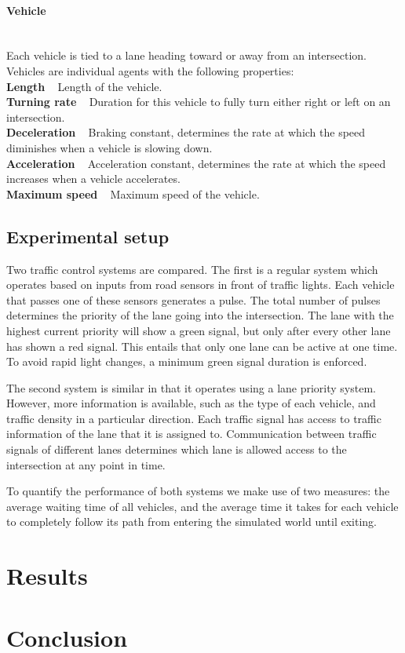 \documentclass{article}
\begin{document}
\paragraph{Vehicle} ~\\
Each vehicle is tied to a lane heading toward or away from an intersection. Vehicles are individual agents with the following properties:\\
\textbf{Length} ~ Length of the vehicle.\\
\textbf{Turning rate} ~ Duration for this vehicle to fully turn either right or left on an intersection.\\
\textbf{Deceleration} ~ Braking constant, determines the rate at which the speed diminishes when a vehicle is slowing down.\\
\textbf{Acceleration} ~ Acceleration constant, determines the rate at which the speed increases when a vehicle accelerates.\\
\textbf{Maximum speed} ~ Maximum speed of the vehicle.\\

\subsection{Experimental setup}
\label{exp_setup}
Two traffic control systems are compared. The first is a regular system which operates based on inputs from road sensors in front of traffic lights. Each vehicle that passes one of these sensors generates a pulse. The total number of pulses determines the priority of the lane going into the intersection. The lane with the highest current priority will show a green signal, but only after every other lane has shown a red signal. This entails that only one lane can be active at one time. To avoid rapid light changes, a minimum green signal duration is enforced.

The second system is similar in that it operates using a lane priority system. However, more information is available, such as the type of each vehicle, and traffic density in a particular direction. Each traffic signal has access to traffic information of the lane that it is assigned to. Communication between traffic signals of different lanes determines which lane is allowed access to the intersection at any point in time.

To quantify the performance of both systems we make use of two measures: the average waiting time of all vehicles, and the average time it takes for each vehicle to completely follow its path from entering the simulated world until exiting.

\section{Results}

\section{Conclusion}




\end{document}
